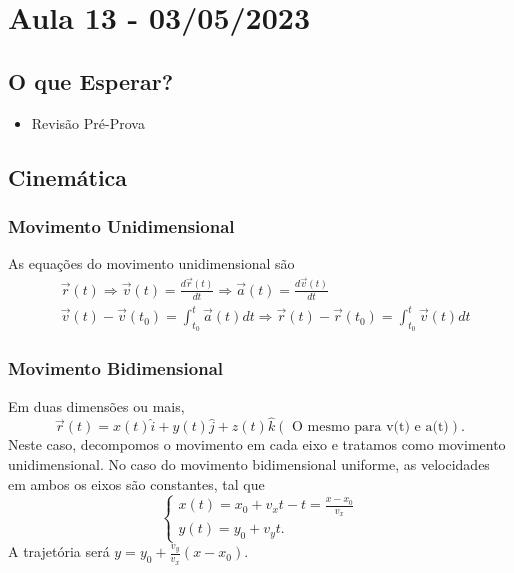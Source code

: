 \documentclass{article}
\begin{document}
\section{Aula 13 - 03/05/2023}
\subsection{O que Esperar?}
\begin{itemize}
  \item Revis\~ao Pr\'e-Prova
\end{itemize}
\subsection{Cinem\'atica}
\subsubsection{Movimento Unidimensional}
  As equa\c c\~oes do movimento unidimensional s\~ao 
 \begin{align*}
   &\vec{r}(t)\Rightarrow \vec{v}(t)=\frac{d \vec{r}(t)}{dt} \Rightarrow \vec{a}(t) = \frac{d \vec{v}(t)}{dt} \\
   &\vec{v}(t)-\vec{v}(t_{0}) = \int_{t_{0}}^{t} \vec{a}(t)dt \Rightarrow \vec{r}(t) - \vec{r}(t_{0}) = \int_{t_{0}}^{t} \vec{v}(t)dt
 \end{align*}
 \subsubsection{Movimento Bidimensional}
  Em duas dimens\~oes ou mais, 
    $$
      \vec{r}(t) = x(t)\hat{i} + y(t)\hat{j} + z(t)\hat{k} (\text{ O mesmo para v(t) e a(t)}).
    $$
    Neste caso, decompomos o movimento em cada eixo e tratamos como movimento unidimensional. No caso do movimento bidimensional uniforme,
    as velocidades em ambos os eixos s\~ao constantes, tal que 
      $$
         \left\{\begin{array}{ll}
            x(t) = x_{0} + v_{x}t - t = \frac{x-x_{0}}{v_{x}}\\
            y(t) = y_{0} + v_{y}t.
          \end{array}\right.
      $$
      A trajet\'oria ser\'a $y=y_{0} + \frac{v_{y}}{v_{x}}(x-x_{0}).$ 
\end{document}
